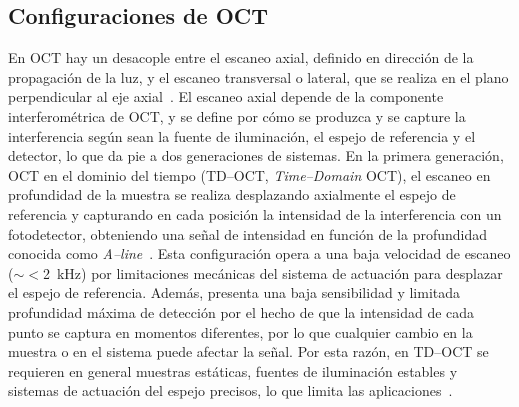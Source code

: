 \documentclass[letter, 12 pt]{article}
\begin{document}
	\subsection{Configuraciones de OCT}

En OCT hay un desacople entre el escaneo axial, definido en dirección de la propagación de la luz, y el escaneo transversal o lateral, que se realiza en el plano perpendicular al eje axial~\cite{drexler2015}. El escaneo axial depende de la componente interferométrica de OCT, y se define por cómo se produzca y se capture la interferencia según sean la fuente de iluminación, el espejo de referencia y el detector, lo que da pie a dos generaciones de sistemas. En la primera generación, OCT en el dominio del tiempo (TD--OCT, \textit{Time--Domain} OCT), el escaneo en profundidad de la muestra se realiza desplazando axialmente el espejo de referencia y capturando en cada posición la intensidad de la interferencia con un fotodetector, obteniendo una señal de intensidad en función de la profundidad conocida como \textit{A--line}~\cite{huang1991}. Esta configuración opera a una baja velocidad de escaneo ($\sim<$2~kHz) por limitaciones mecánicas del sistema de actuación para desplazar el espejo de referencia. Además, presenta una baja sensibilidad y limitada profundidad máxima de detección por el hecho de que la intensidad de cada punto se captura en momentos diferentes, por lo que cualquier cambio en la muestra o en el sistema puede afectar la señal. Por esta razón, en TD--OCT se requieren en general muestras estáticas, fuentes de iluminación estables y sistemas de actuación del espejo precisos, lo que limita las aplicaciones~\cite{drexler2015}. \\
\end{document}
